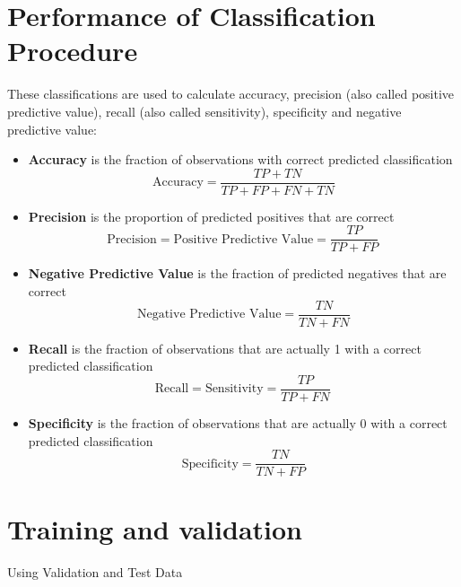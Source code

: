 \documentclass[]{report}
\begin{document}
\section{Performance of Classification Procedure}
	
	These classifications are used to calculate accuracy, precision (also called positive predictive value), recall (also called sensitivity), specificity and negative predictive value:
	
	\begin{itemize}
		\item  \textbf{Accuracy} is the fraction of observations with correct predicted classification
		\[ \mbox{Accuracy}=\frac{TP+TN}{TP+FP+FN+TN}\]
		
		
		\item \textbf{Precision} is the proportion of predicted positives that are correct
		\[
		\mbox{Precision} = \mbox{Positive Predictive Value} =\frac{TP}{TP+FP} \, \]
		
		\item \textbf{Negative Predictive Value} is the  fraction of predicted negatives that are correct
		\[\mbox{Negative Predictive Value} = \frac{TN}{TN+FN}\]
		
		\item \textbf{Recall} is the fraction of observations that are actually 1 with a correct predicted classification
		\[ 
		\mbox{Recall} = \mbox{Sensitivity} = \frac{TP}{TP+FN} \,  \]
		
		\item \textbf{Specificity} is the fraction of observations that are actually 0 with a correct predicted classification
		\[ \mbox{Specificity} = \frac{TN}{TN+FP} \]
		
	\end{itemize}



\section{Training and validation}
Using Validation and Test Data

\end{document}
